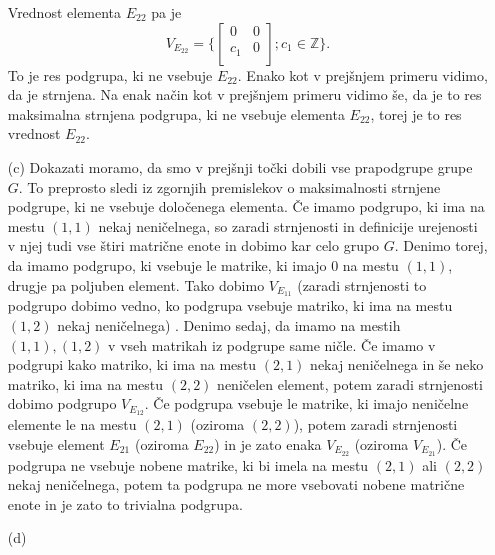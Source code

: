 \documentclass[a4paper, 12pt]{article}
\newcommand{\Z}{\mathbb{Z}}
\begin{document}
\begin{enumerate}
Vrednost elementa $E_{22}$ pa je 
$$
V_{E_{22}} = \big\{
\begin{bmatrix}
0 & 0 \\
c_1 & 0 \\
\end{bmatrix};
c_1 \in \Z
\big\}. 
$$
To je res podgrupa, ki ne vsebuje $E_{22}$. Enako kot v prejšnjem primeru vidimo, da je strnjena. Na enak način kot v prejšnjem primeru vidimo še, da je to res maksimalna strnjena podgrupa, ki ne vsebuje elementa $E_{22}$, torej je to res vrednost $E_{22}$.

\item[(c)] Dokazati moramo, da smo v prejšnji točki dobili vse prapodgrupe grupe $G$. To preprosto sledi iz zgornjih premislekov o maksimalnosti strnjene podgrupe, ki ne vsebuje določenega elementa. Če imamo podgrupo, ki ima na mestu $(1,1)$ nekaj neničelnega, so zaradi strnjenosti in definicije urejenosti v njej tudi vse štiri matrične enote in dobimo kar celo grupo $G$. Denimo torej, da imamo podgrupo, ki vsebuje le matrike, ki imajo 0 na mestu $(1,1)$, drugje pa poljuben element. Tako dobimo $V_{E_{11}}$ (zaradi strnjenosti to podgrupo dobimo vedno, ko podgrupa vsebuje matriko, ki ima na mestu $(1,2)$ nekaj neničelnega) . Denimo sedaj, da imamo na mestih $(1,1),(1,2)$ v vseh matrikah iz podgrupe same ničle. Če imamo v podgrupi kako matriko, ki ima na mestu $(2,1)$ nekaj neničelnega in še neko matriko, ki ima na mestu $(2,2)$ neničelen element, potem zaradi strnjenosti dobimo podgrupo $V_{E_{12}}$. Če podgrupa vsebuje le matrike, ki imajo neničelne elemente le na mestu $(2,1)$ (oziroma $(2,2)$), potem zaradi strnjenosti vsebuje element $E_{21}$ (oziroma $E_{22}$) in je zato enaka $V_{E_{22}}$ (oziroma $V_{E_{21}}$). Če podgrupa ne vsebuje nobene matrike, ki bi imela na mestu $(2,1)$ ali $(2,2)$ nekaj neničelnega, potem ta podgrupa ne more vsebovati nobene matrične enote in je zato to trivialna podgrupa. 
\item[(d)]
\end{enumerate}
\end{document}
